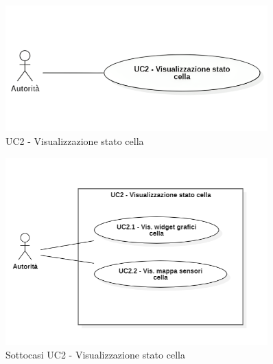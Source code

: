 

\begin{figure}[H]
    \centering
    \includegraphics[width=0.9\textwidth]{../Images/uc2.png}
    \caption{UC2 - Visualizzazione stato cella}
    \label{fig:UC2}
\end{figure}


\begin{figure}[H]
    \centering
    \includegraphics[width=0.9\textwidth]{../Images/uc2_Subcase.PNG}
    \caption{Sottocasi UC2 - Visualizzazione stato cella}
    \label{fig:UC2_sub}
\end{figure}






